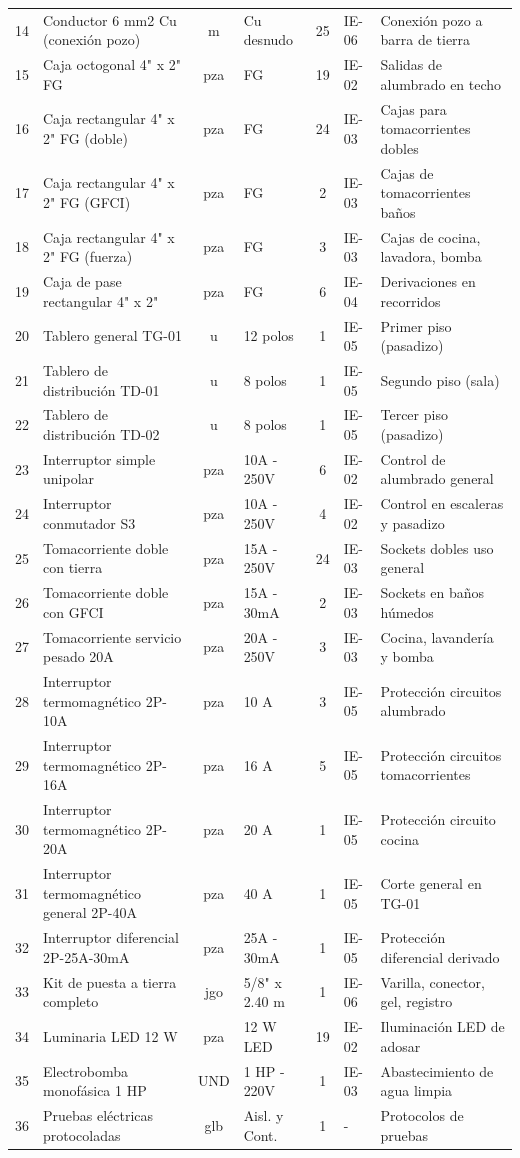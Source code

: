 \begin{longtable}{c L{4.0cm} c L{2.0cm} c L{1.8cm} L{2.8cm}}
14 & Conductor 6 mm2 Cu (conexión pozo) & m & Cu desnudo & 25 & IE-06 & Conexión pozo a barra de tierra \\
15 & Caja octogonal 4" x 2" FG & pza & FG & 19 & IE-02 & Salidas de alumbrado en techo \\
16 & Caja rectangular 4" x 2" FG (doble) & pza & FG & 24 & IE-03 & Cajas para tomacorrientes dobles \\
17 & Caja rectangular 4" x 2" FG (GFCI) & pza & FG & 2 & IE-03 & Cajas de tomacorrientes baños \\
18 & Caja rectangular 4" x 2" FG (fuerza) & pza & FG & 3 & IE-03 & Cajas de cocina, lavadora, bomba \\
19 & Caja de pase rectangular 4" x 2" & pza & FG & 6 & IE-04 & Derivaciones en recorridos \\
20 & Tablero general TG-01 & u & 12 polos & 1 & IE-05 & Primer piso (pasadizo) \\
21 & Tablero de distribución TD-01 & u & 8 polos & 1 & IE-05 & Segundo piso (sala) \\
22 & Tablero de distribución TD-02 & u & 8 polos & 1 & IE-05 & Tercer piso (pasadizo) \\
23 & Interruptor simple unipolar & pza & 10A - 250V & 6 & IE-02 & Control de alumbrado general \\
24 & Interruptor conmutador S3 & pza & 10A - 250V & 4 & IE-02 & Control en escaleras y pasadizo \\
25 & Tomacorriente doble con tierra & pza & 15A - 250V & 24 & IE-03 & Sockets dobles uso general \\
26 & Tomacorriente doble con GFCI & pza & 15A - 30mA & 2 & IE-03 & Sockets en baños húmedos \\
27 & Tomacorriente servicio pesado 20A & pza & 20A - 250V & 3 & IE-03 & Cocina, lavandería y bomba \\
28 & Interruptor termomagnético 2P-10A & pza & 10 A & 3 & IE-05 & Protección circuitos alumbrado \\
29 & Interruptor termomagnético 2P-16A & pza & 16 A & 5 & IE-05 & Protección circuitos tomacorrientes \\
30 & Interruptor termomagnético 2P-20A & pza & 20 A & 1 & IE-05 & Protección circuito cocina \\
31 & Interruptor termomagnético general 2P-40A & pza & 40 A & 1 & IE-05 & Corte general en TG-01 \\
32 & Interruptor diferencial 2P-25A-30mA & pza & 25A - 30mA & 1 & IE-05 & Protección diferencial derivado \\
33 & Kit de puesta a tierra completo & jgo & 5/8" x 2.40 m & 1 & IE-06 & Varilla, conector, gel, registro \\
34 & Luminaria LED 12 W & pza & 12 W LED & 19 & IE-02 & Iluminación LED de adosar \\
35 & Electrobomba monofásica 1 HP & UND & 1 HP - 220V & 1 & IE-03 & Abastecimiento de agua limpia \\
36 & Pruebas eléctricas protocoladas & glb & Aisl. y Cont. & 1 & - & Protocolos de pruebas \\
\end{longtable}
\endgroup
